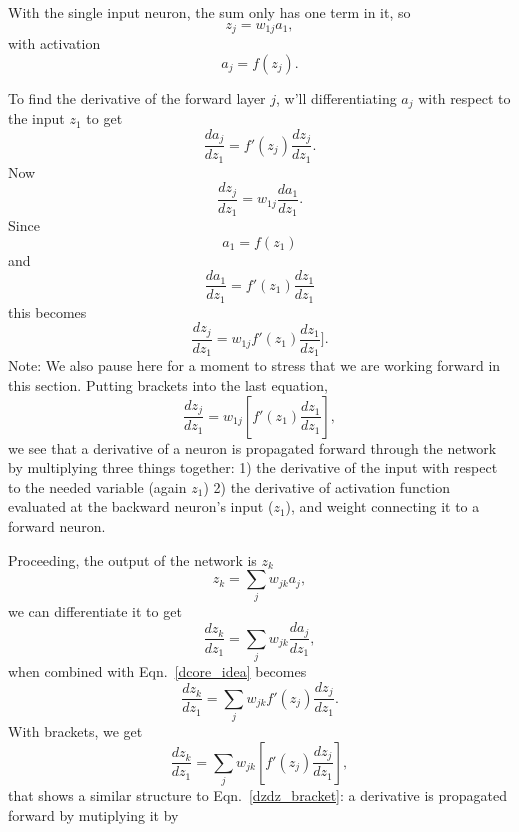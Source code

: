 \documentclass[12pt]{article}
\begin{document}
With the single input neuron, the sum only has one term in it, so
\begin{equation}
z_j=w_{1j}{a_1},
\end{equation}
with activation
\begin{equation}
a_j=f(z_j).
\end{equation}




To find the derivative of the forward layer $j$, w'll differentiating $a_j$ with respect to the input $z_1$ to get
\begin{equation}
\label{dcore_idea}
\frac{da_j}{dz_1}=f'(z_j)\frac{dz_j}{dz_1}.
\end{equation}
Now
\begin{equation}
\label{dz_j_by_dz_1}
\frac{dz_j}{dz_1}=w_{1j}\frac{da_1}{dz_1}.
\end{equation}
Since 
\begin{equation}
a_1=f(z_1)
\end{equation}
and
\begin{equation}
\frac{da_1}{dz_1}=f'(z_1)\frac{dz_1}{dz_1}
\end{equation}
this becomes
\begin{equation}
\frac{dz_j}{dz_1}=w_{1j}f'(z_1)\frac{dz_1}{dz_1}].
\end{equation}
Note: We also pause here for a moment to stress that we are working forward in this section.  Putting brackets into the last equation, 
\begin{equation}
\label{dzdz_bracket}
\frac{dz_j}{dz_1}=w_{1j}\left[f'(z_1)\frac{dz_1}{dz_1}\right],
\end{equation}
we see that a derivative of a neuron is propagated forward through the network by multiplying three things together: 1) the derivative of the input with respect to the needed variable (again $z_1$) 2) the derivative of activation function evaluated at the backward neuron's input ($z_1$), and weight connecting it to a forward neuron.

Proceeding, the output of the network is $z_k$
\begin{equation}
z_k=\sum_j w_{jk} a_j,
\end{equation}
we can differentiate it to get 
\begin{equation}
\frac{dz_k}{dz_1}=\sum_j w_{jk}\frac{da_j}{dz_1},
\end{equation}
when combined with Eqn.~\ref{dcore_idea} becomes
\begin{equation}
\frac{dz_k}{dz_1}=\sum_j w_{jk}f'(z_j)\frac{dz_j}{dz_1}.
\end{equation}
With brackets, we get
\begin{equation}
\frac{dz_k}{dz_1}=\sum_j w_{jk}\left[f'(z_j)\frac{dz_j}{dz_1}\right],
\end{equation}
that shows a similar structure to Eqn.~\ref{dzdz_bracket}: a derivative is propagated forward by mutiplying it by 
\end{document}
